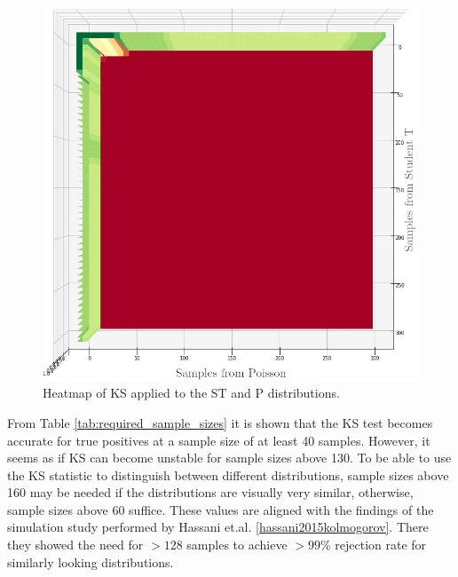 \begin{figure}[h]
  \centering
  \includegraphics[width=\linewidth]{./img/hypothesis_test/deepar_heatmap_Y_student_t_X_poisson_ks_edited.png}
  \endminipage
  \caption{Heatmap of KS applied to the ST and P distributions.}
  \label{ks_student_t_poisson}
\end{figure}
\clearpage

From Table \ref{tab:required_sample_sizes} it is shown that the KS test becomes accurate for true positives at a sample size of at least 40 samples. However, it seems as if KS can become unstable for sample sizes above 130. To be able to use the KS statistic to distinguish between different distributions, sample sizes above 160 may be needed if the distributions are visually very similar, otherwise, sample sizes above \(60\) suffice. These values are aligned with the findings of the simulation study performed by Hassani et.al. \ref{hassani2015kolmogorov}. There they showed the need for \(>128\) samples to achieve \(>99\)\% rejection rate for similarly looking distributions.

